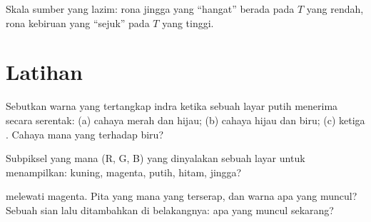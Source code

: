 \begin{omfigure}

{\small Skala  sumber yang lazim: rona jingga yang ``hangat''
berada pada $T$ yang rendah, rona kebiruan yang ``sejuk'' pada $T$ yang
tinggi.}
\end{omfigure}

\section{Latihan}

\begin{exercise}[$\star$]\label{exo:g11:color-light-sources:1}
Sebutkan warna yang tertangkap indra ketika sebuah layar putih menerima
secara serentak: (a) cahaya merah dan hijau; (b) cahaya hijau dan biru;
(c) ketiga . Cahaya mana yang  terhadap
biru?
\end{exercise}

\begin{exercise}[$\star$]\label{exo:g11:color-light-sources:2}
Subpiksel yang mana (R, G, B) yang dinyalakan sebuah layar untuk
menampilkan: kuning, magenta, putih, hitam, jingga?
\end{exercise}

\begin{exercise}[$\star$]\label{exo:g11:color-light-sources:3}
 melewati  magenta. Pita yang mana yang terserap, dan
warna apa yang muncul? Sebuah  sian lalu ditambahkan di
belakangnya: apa yang muncul sekarang?
\end{exercise}

